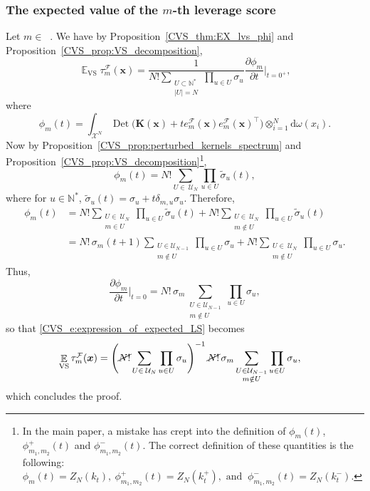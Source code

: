 \documentclass[twoside,11pt]{book}
\numberwithin{theorem}{chapter}
\numberwithin{definition}{chapter}
\numberwithin{proposition}{chapter}
\numberwithin{corollary}{chapter}
\numberwithin{example}{chapter}
\numberwithin{lemma}{chapter}
\numberwithin{assumption}{chapter}
\DeclareMathOperator{\Det}{Det}
\DeclareMathOperator{\VS}{\mathrm{VS}}
\DeclareMathOperator{\Tran}{\intercal}
\DeclareMathOperator{\EX}{\mathbb{E}}
\DeclareMathOperator{\F}{\mathcal{F}}
\DeclareMathOperator{\Ns}{\mathbb{N}^{*}}
\def\UN{\:\mathcal{U}_N}
\begin{document}
\subsubsection{The expected value of the $m$-th leverage score}
Let $m \in \Ns$. We have by Proposition~\ref{CVS_thm:EX_lvs_phi} and Proposition~\ref{CVS_prop:VS_decomposition},
\begin{equation}
\EX_{\VS} \tau_{m}^{\F}(\bm{x})  = \frac{1}{N!\sum\limits_{\substack{U \subset \mathbb{N}^{*}\\ |U| = N}} \prod\limits_{u \in U}\sigma_{u}}  \frac{\partial \phi_{m}}{ \partial t }|_{t = 0^{+}},
\label{CVS_e:expression_of_expected_LS}\end{equation}
where
\begin{equation}
\phi_{m}(t) = \int_{\mathcal{X}^{N}} \Det \bigg(\bm{K}(\bm{x})+t e_{m}^{\mathcal{F}}(\bm{x})e_{m}^{\mathcal{F}}(\bm{x})^{\Tran} \bigg) \otimes_{i =1}^{N} \mathrm{d}\omega(x_{i}).
\end{equation}
Now by Proposition~\ref{CVS_prop:perturbed_kernels_spectrum} and Proposition~\ref{CVS_prop:VS_decomposition}\footnote{In the main paper, a mistake has crept into the definition of $\phi_{m}(t)$, $\phi_{m_{1},m_{2}}^{+}(t)$ and $\phi_{m_{1},m_{2}}^{-}(t)$. The correct definition of these quantities is the following: $
\phi_{m}(t) = Z_{N}(k_{t}) , \: \phi_{m_{1},m_{2}}^{+}(t) = Z_{N}(k_{t}^{+}),  \text{ and }\: \phi_{m_{1},m_{2}}^{-}(t) = Z_{N}(k_{t}^{-}). $},
\begin{equation}
\phi_{m}(t) = N! \sum\limits_{U\in\UN} \prod\limits_{u \in U} \tilde{\sigma}_{u}(t),
\end{equation}
where for $u \in \mathbb{N}^{*}$, $\tilde{\sigma}_{u}(t) = \sigma_{u} + t\delta_{m,u}\sigma_{u}$.
Therefore,
\begin{align}
\phi_{m}(t) & = N!\sum\limits_{\substack{U \in\UN \\ m \in U}} \prod\limits_{u \in U} \tilde{\sigma}_{u}(t) + N!\sum\limits_{\substack{U \in\UN \\ m \notin U}} \prod\limits_{u \in U} \tilde{\sigma}_{u}(t) \\
& = N!\,\sigma_{m}(t+1)\sum\limits_{\substack{U\in \mathcal{U}_{N-1}\\ m \notin U}} \prod\limits_{u \in U} \sigma_{u} + N!\sum\limits_{\substack{U \in\UN \\ m \notin U}} \prod\limits_{u \in U} \sigma_{u}.
\end{align}
Thus,  
\begin{equation}
\frac{\partial \phi_{m}}{\partial t}|_{t = 0} = N!\,\sigma_{m}\sum\limits_{\substack{U\in \mathcal{U}_{N-1}\\ m \notin U}} \prod\limits_{u \in U} \sigma_{u},
\end{equation}
so that \eqref{CVS_e:expression_of_expected_LS} becomes
\begin{align}
\EX_{\VS} \tau_{m}^{\F}(\bm{x}) & = \left(\cancel{N!}\sum\limits_{U\in\UN}\prod\limits_{u \in U}\sigma_{u} \right)^{-1} \cancel{N!}\,\sigma_{m}\sum\limits_{\substack{U\in \mathcal{U}_{N-1}\\ m \notin U}} \prod\limits_{u \in U} \sigma_{u},
\end{align}
which concludes the proof.
\end{document}
